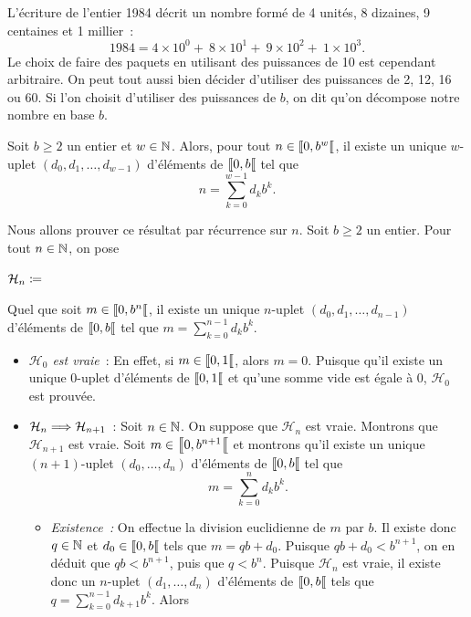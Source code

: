 \documentclass{magnolia}
\begin{document}
L'écriture de l'entier 1984 décrit un nombre formé de 4 unités, 8 dizaines, 9 centaines
et 1 millier~:
\[1984 = 4\times 10^0 +\ 8\times 10^1 + \ 9 \times 10^2 + \ 1\times 10^3.\]
Le choix de faire des paquets en utilisant des puissances de 10 est cependant arbitraire.
On peut tout aussi bien décider d'utiliser des puissances de 2, 12, 16 ou 60. Si l'on choisit
d'utiliser des puissances de $b$, on dit qu'on décompose notre nombre en base $b$.

\begin{proposition}
Soit $b\geq 2$ un entier et $w\in\mathbb{N}$. Alors, pour tout $n\in\left\llbracket 0,b^w\right\llbracket$, il existe un unique $w$-uplet $(d_0,d_1,\ldots,d_{w-1})$ d'éléments de $\left\llbracket 0,b\right\llbracket$ tel que
\[n=\sum_{k=0}^{w-1} d_k b^k.\]
\end{proposition}

\begin{preuve}
Nous allons prouver ce résultat par récurrence sur $n$. Soit $b\geq 2$ un entier. Pour tout $n\in\mathbb{N}$, on pose
\begin{center}
$\mathcal{H}_n\coloneqq$ \og
\begin{minipage}[t]{0.6\linewidth}
Quel que soit $m\in\left\llbracket 0,b^n\right\llbracket$, il existe un unique $n$-uplet $(d_0,d_1,\ldots,d_{n-1})$ d'éléments de $\left\llbracket 0,b\right\llbracket$ tel que
$m=\sum_{k=0}^{n-1} d_k b^k$.\fg
\end{minipage}
\end{center}
\begin{itemize}
\item \emph{$\mathcal{H}_0$ est vraie}~: En effet, si $m\in\left\llbracket 0,1\right\llbracket$, alors $m=0$. Puisque qu'il existe un unique $0$-uplet d'éléments de $\left\llbracket 0,1\right\llbracket$ et qu'une somme vide est égale à 0, $\mathcal{H}_0$ est prouvée.
\item $\mathcal{H}_n\Longrightarrow\mathcal{H}_{n+1}$~: Soit $n\in\mathbb{N}$. On suppose que $\mathcal{H}_n$ est vraie. Montrons que $\mathcal{H}_{n+1}$ est vraie. Soit $m\in\left\llbracket 0,b^{n+1}\right\llbracket$ et montrons qu'il existe un unique $(n+1)$-uplet $(d_0,\ldots,d_n)$ d'éléments de $\left\llbracket 0,b\right\llbracket$ tel que
\[m=\sum_{k=0}^{n} d_k b^k.\]
\begin{itemize}
\item \emph{Existence~:} On effectue la division euclidienne de $m$ par $b$. Il existe donc $q\in\mathbb{N}$ et $d_0\in\left\llbracket 0,b\right\llbracket$ tels que $m=qb+d_0$. Puisque $qb+d_0< b^{n+1}$, on en déduit que $qb<b^{n+1}$, puis que $q<b^n$. Puisque $\mathcal{H}_n$ est vraie, il existe donc un $n$-uplet $(d_1,\ldots,d_n)$ d'éléments de $\left\llbracket 0,b\right\llbracket$ tels que $q=\sum_{k=0}^{n-1} d_{k+1} b^k$. Alors

\end{itemize}
\end{itemize}
\end{preuve}
\end{document}

